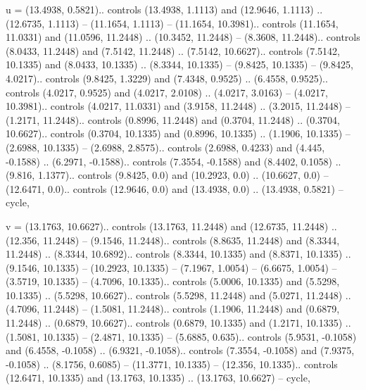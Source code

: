 u = {(13.4938, 0.5821).. controls (13.4938, 1.1113) and (12.9646, 1.1113) .. (12.6735, 1.1113) -- (11.1654, 1.1113) -- (11.1654, 10.3981).. controls (11.1654, 11.0331) and (11.0596, 11.2448) .. (10.3452, 11.2448) -- (8.3608, 11.2448).. controls (8.0433, 11.2448) and (7.5142, 11.2448) .. (7.5142, 10.6627).. controls (7.5142, 10.1335) and (8.0433, 10.1335) .. (8.3344, 10.1335) -- (9.8425, 10.1335) -- (9.8425, 4.0217).. controls (9.8425, 1.3229) and (7.4348, 0.9525) .. (6.4558, 0.9525).. controls (4.0217, 0.9525) and (4.0217, 2.0108) .. (4.0217, 3.0163) -- (4.0217, 10.3981).. controls (4.0217, 11.0331) and (3.9158, 11.2448) .. (3.2015, 11.2448) -- (1.2171, 11.2448).. controls (0.8996, 11.2448) and (0.3704, 11.2448) .. (0.3704, 10.6627).. controls (0.3704, 10.1335) and (0.8996, 10.1335) .. (1.1906, 10.1335) -- (2.6988, 10.1335) -- (2.6988, 2.8575).. controls (2.6988, 0.4233) and (4.445, -0.1588) .. (6.2971, -0.1588).. controls (7.3554, -0.1588) and (8.4402, 0.1058) .. (9.816, 1.1377).. controls (9.8425, 0.0) and (10.2923, 0.0) .. (10.6627, 0.0) -- (12.6471, 0.0).. controls (12.9646, 0.0) and (13.4938, 0.0) .. (13.4938, 0.5821) -- cycle},

v = {(13.1763, 10.6627).. controls (13.1763, 11.2448) and (12.6735, 11.2448) .. (12.356, 11.2448) -- (9.1546, 11.2448).. controls (8.8635, 11.2448) and (8.3344, 11.2448) .. (8.3344, 10.6892).. controls (8.3344, 10.1335) and (8.8371, 10.1335) .. (9.1546, 10.1335) -- (10.2923, 10.1335) -- (7.1967, 1.0054) -- (6.6675, 1.0054) -- (3.5719, 10.1335) -- (4.7096, 10.1335).. controls (5.0006, 10.1335) and (5.5298, 10.1335) .. (5.5298, 10.6627).. controls (5.5298, 11.2448) and (5.0271, 11.2448) .. (4.7096, 11.2448) -- (1.5081, 11.2448).. controls (1.1906, 11.2448) and (0.6879, 11.2448) .. (0.6879, 10.6627).. controls (0.6879, 10.1335) and (1.2171, 10.1335) .. (1.5081, 10.1335) -- (2.4871, 10.1335) -- (5.6885, 0.635).. controls (5.9531, -0.1058) and (6.4558, -0.1058) .. (6.9321, -0.1058).. controls (7.3554, -0.1058) and (7.9375, -0.1058) .. (8.1756, 0.6085) -- (11.3771, 10.1335) -- (12.356, 10.1335).. controls (12.6471, 10.1335) and (13.1763, 10.1335) .. (13.1763, 10.6627) -- cycle},

